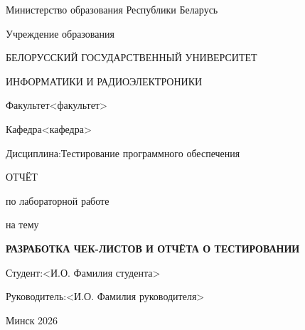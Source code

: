 \documentclass[a4paper,14pt]{extarticle}
\begin{document}
\begin{titlepage}
\centering
Министерство образования Республики Беларусь\par
\vspace{\baselineskip}
Учреждение образования\par
БЕЛОРУССКИЙ ГОСУДАРСТВЕННЫЙ УНИВЕРСИТЕТ\par
ИНФОРМАТИКИ И РАДИОЭЛЕКТРОНИКИ\par
\vspace{\baselineskip}
\vspace{\baselineskip}
\noindent Факультет\hspace{1em}<факультет>\par
\vspace{\baselineskip}
\noindent Кафедра\hspace{1em}<кафедра>\par
\vspace{\baselineskip}
\noindent Дисциплина:\hspace{1em}Тестирование программного обеспечения\par
\vspace{\baselineskip}
\vspace{\baselineskip}
ОТЧЁТ\par
по лабораторной работе\par
на тему\par
\vspace{\baselineskip}
\textbf{РАЗРАБОТКА ЧЕК-ЛИСТОВ И ОТЧЁТА О ТЕСТИРОВАНИИ}\par
\vspace{\baselineskip}
\vspace{\baselineskip}
\vspace{\baselineskip}
\vspace{\baselineskip}
\noindent Студент:\hfill <И.О. Фамилия студента>\par
\vspace{\baselineskip}
\vspace{\baselineskip}
\noindent Руководитель:\hfill <И.О. Фамилия руководителя>\par
\vspace{\baselineskip}
\vspace{\baselineskip}
\vspace{\baselineskip}
\vspace{\baselineskip}
\vspace{\baselineskip}
\vspace{\baselineskip}
\vspace{\baselineskip}
\vspace{\baselineskip}
Минск 2026\par
\end{titlepage}
\end{document}

